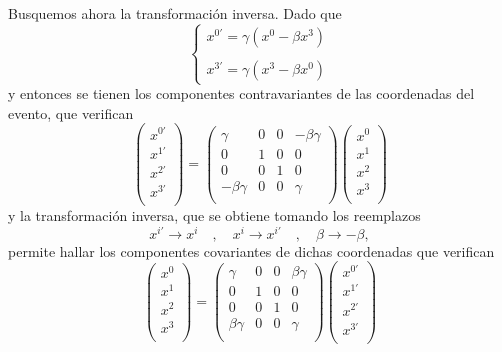 \documentclass[10pt,oneside]{CBFT_book}
\begin{document}
Busquemos ahora la transformación inversa. Dado que
\[
	\begin{cases}
	x^{0'} = \gamma (x^0 - \beta x^3) \\
	\\
	x^{3'} = \gamma (x^3 - \beta x^0)
	\end{cases}
\]
y entonces se tienen los componentes contravariantes de las coordenadas del evento,
que verifican
\[
	\begin{pmatrix}
	 x^{0'} \\
	 x^{1'} \\
	 x^{2'} \\
	 x^{3'} \\
	\end{pmatrix}
	=
	\begin{pmatrix}
	\gamma & 0 & 0 & -\beta\gamma \\
	0 & 1 & 0 & 0 \\
	0 & 0 & 1 & 0\\
	-\beta\gamma  & 0 & 0 & \gamma \\
	\end{pmatrix}
	\begin{pmatrix}
	 x^{0} \\
	 x^{1} \\
	 x^{2} \\
	 x^{3} \\
	\end{pmatrix}
\]
y la transformación inversa, que se obtiene tomando los reemplazos
\[
	x^{i'} \to x^i \quad ,\quad  x^i \to x^{i'} \quad ,\quad  \beta \to -\beta,
\]
permite hallar los componentes covariantes de dichas coordenadas que verifican
\[
	\begin{pmatrix}
	 x^{0} \\
	 x^{1} \\
	 x^{2} \\
	 x^{3} \\
	\end{pmatrix}
	=
	\begin{pmatrix}
	\gamma & 0 & 0 & \beta\gamma \\
	0 & 1 & 0 & 0 \\
	0 & 0 & 1 & 0\\
	\beta\gamma  & 0 & 0 & \gamma \\
	\end{pmatrix}
	\begin{pmatrix}
	 x^{0'} \\
	 x^{1'} \\
	 x^{2'} \\
	 x^{3'} \\
	\end{pmatrix}
\]
\end{document}
